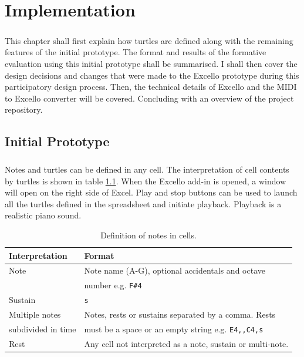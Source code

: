 
\chapter{Implementation}

\paragraph{} This chapter shall first explain how turtles are defined along with the remaining features of the initial prototype. The format and results of the formative evaluation using this initial prototype shall be summarised. I shall then cover the design decisions and changes that were made to the Excello prototype during this participatory design process. Then, the technical details of Excello and the MIDI to Excello converter will be covered. Concluding with an overview of the project repository.

\section{Initial Prototype}

\paragraph{} Notes and turtles can be defined in any cell. The interpretation of cell contents by turtles is shown in table \ref{tab:cells}. When the Excello add-in is opened, a window will open on the right side of Excel. Play and stop buttons can be used to launch all the turtles defined in the spreadsheet and initiate playback. Playback is a realistic piano sound.

\begin{table}
\centering
\caption{Definition of notes in cells.}
\vspace{1pt}
\begin{tabular}{|l|l|} \hline
\textbf{Interpretation}&\textbf{Format}\\ \hline
Note& Note name (A-G), optional accidentals and octave \\
&number e.g. \texttt{F\#4}\\ \hline
Sustain& \texttt{s}\\ \hline
Multiple notes& Notes, rests or sustains separated by a comma. Rests \\
subdivided in time& must be a space or an empty string e.g. \texttt{E4,,C4,s}\\ \hline
Rest& Any cell not interpreted as a note, sustain or multi-note. \\ \hline
\end{tabular}
\label{tab:cells}
\end{table}

